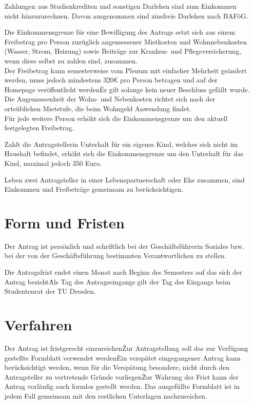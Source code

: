 \begin{multicols}{2}
\Abs \Satz Zahlungen aus Studienkrediten und sonstigen Darlehen sind zum Einkommen nicht hinzuzurechnen. Davon ausgenommen sind zinsfreie Darlehen nach BAFöG.

\Abs \Satz Die Einkommensgrenze für eine Bewilligung des Antrags setzt sich aus einem Freibetrag pro Person zuzüglich angemessener Mietkosten und Wohnnebenkosten (Wasser, Strom, Heizung) sowie Beiträge zur Kranken- und Pflegeversicherung, wenn diese selbst zu zahlen sind, zusammen.\\
\Satz Der Freibetrag kann semesterweise vom Plenum mit einfacher Mehrheit geändert werden, muss jedoch mindestens 320€ pro Person betragen und auf der Homepage veröffentlicht werden\. Er gilt solange kein neuer Beschluss gefällt wurde. \\
\Satz Die Angemessenheit der Wohn- und Nebenkosten richtet sich nach der ortsüblichen Mietstufe, die beim Wohngeld Anwendung findet. \\
\Satz Für jede weitere Person erhöht sich die Einkommensgrenze um den aktuell festgelegten Freibetrag.

\Abs \Satz Zahlt die Antragstellerin Unterhalt für ein eigenes Kind, welches sich nicht im Haushalt befindet, erhöht sich die Einkommensgrenze um den Unterhalt für das Kind, maximal jedoch 350 Euro.

\Abs \Satz Leben zwei Antragsteller in einer Lebenspartnerschaft oder Ehe zusammen, sind Einkommen und Freibeträge gemeinsam zu berücksichtigen.

\section{Form und Fristen}

\Abs \Satz Der Antrag ist persönlich und schriftlich bei der Geschäftsführerin Soziales bzw. bei der von der Geschäftsführung bestimmten Verantwortlichen zu stellen.

\Abs \Satz Die Antragsfrist endet einen Monat nach Beginn des Semesters auf das sich der Antrag bezieht\. Als Tag des Antragseingangs gilt der Tag des Eingangs beim Studentenrat der TU Dresden.


\section{Verfahren}

\Abs \Satz Der Antrag ist fristgerecht einzureichen\. Zur Antragstellung soll das zur Verfügung gestellte Formblatt verwendet werden\. Ein verspätet eingegangener Antrag kann berücksichtigt werden, wenn für die Verspätung besondere, nicht durch den Antragsteller zu vertretende Gründe vorliegen\. Zur Wahrung der Frist kann der Antrag vorläufig auch formlos gestellt werden. Das ausgefüllte Formblatt ist in jedem Fall gemeinsam mit den restlichen Unterlagen nachzureichen.


\end{multicols}
